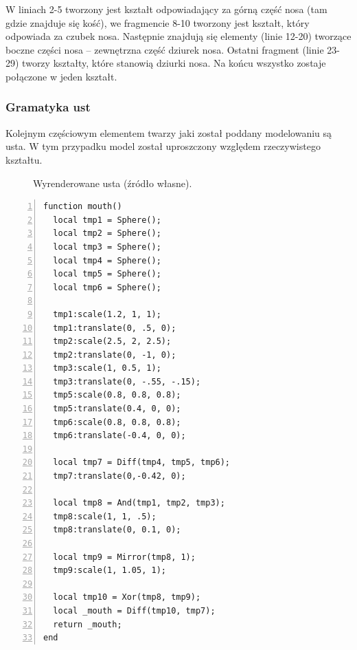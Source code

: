 W liniach 2-5 tworzony jest kształt odpowiadający za górną część nosa (tam gdzie
znajduje się kość), we fragmencie 8-10 tworzony jest kształt, który odpowiada za
czubek nosa. Następnie znajdują się elementy (linie 12-20) tworzące boczne
części nosa -- zewnętrzna część dziurek nosa. Ostatni fragment (linie 23-29)
tworzy kształty, które stanowią dziurki nosa. Na końcu wszystko zostaje
połączone w jeden kształt.

\subsubsection{Gramatyka ust}
Kolejnym częściowym elementem twarzy jaki został poddany modelowaniu są usta. W
tym przypadku model został uproszczony względem rzeczywistego kształtu.

\begin{figure}[h!]
  \centering
  \qquad
  \caption{Wyrenderowane usta (źródło własne).}
\end{figure}

{
\small
\begin{lstlisting}[numbers=left,frame=single,numberstyle=\tiny,backgroundcolor=\color{code_back},breaklines=true]
function mouth()
  local tmp1 = Sphere();
  local tmp2 = Sphere();
  local tmp3 = Sphere();
  local tmp4 = Sphere();
  local tmp5 = Sphere();
  local tmp6 = Sphere();

  tmp1:scale(1.2, 1, 1);
  tmp1:translate(0, .5, 0);
  tmp2:scale(2.5, 2, 2.5);
  tmp2:translate(0, -1, 0);
  tmp3:scale(1, 0.5, 1);
  tmp3:translate(0, -.55, -.15);
  tmp5:scale(0.8, 0.8, 0.8);
  tmp5:translate(0.4, 0, 0);
  tmp6:scale(0.8, 0.8, 0.8);
  tmp6:translate(-0.4, 0, 0);

  local tmp7 = Diff(tmp4, tmp5, tmp6);
  tmp7:translate(0,-0.42, 0);

  local tmp8 = And(tmp1, tmp2, tmp3);
  tmp8:scale(1, 1, .5);
  tmp8:translate(0, 0.1, 0);

  local tmp9 = Mirror(tmp8, 1);
  tmp9:scale(1, 1.05, 1);

  local tmp10 = Xor(tmp8, tmp9);
  local _mouth = Diff(tmp10, tmp7);
  return _mouth;
end
\end{lstlisting}
}

